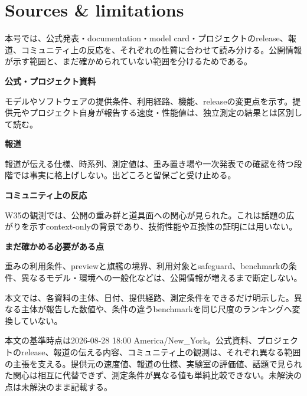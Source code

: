 \section*{Sources \& limitations}

本号では、公式発表・documentation・model card・プロジェクトのrelease、報道、コミュニティ上の反応を、それぞれの性質に合わせて読み分ける。公開情報が示す範囲と、まだ確かめられていない範囲を分けるためである。

\begin{tcolorbox}[enhanced,breakable,colback=SurveySoft,colframe=SurveyRule,boxrule=0.4pt,arc=1mm,left=3mm,right=3mm,top=2mm,bottom=2mm]
\textbf{公式・プロジェクト資料}\par
モデルやソフトウェアの提供条件、利用経路、機能、releaseの変更点を示す。提供元やプロジェクト自身が報告する速度・性能値は、独立測定の結果とは区別して読む。\par\smallskip
\textbf{報道}\par
報道が伝える仕様、時系列、測定値は、重み置き場や一次発表での確認を待つ段階では事実に格上げしない。出どころと留保ごと受け止める。\par\smallskip
\textbf{コミュニティ上の反応}\par
W35の観測では、公開の重み群と道具面への関心が見られた。これは話題の広がりを示すcontext-onlyの背景であり、技術性能や互換性の証明には用いない。\par\smallskip
\textbf{まだ確かめる必要がある点}\par
重みの利用条件、previewと旗艦の境界、利用対象とsafeguard、benchmarkの条件、異なるモデル・環境への一般化などは、公開情報が増えるまで断定しない。
\end{tcolorbox}

本文では、各資料の主体、日付、提供経路、測定条件をできるだけ明示した。異なる主体が報告した数値や、条件の違うbenchmarkを同じ尺度のランキングへ変換していない。

\nocite{glm53flash,qwen38flash,hy4preview,w35community,granite42,vscodeahp,cursororigin,copilotteams,harness,grith,fable5,gpt56kiro,vllm028,openthai20,autoalign,chinamiit,koreaethics}

\begin{claimboundary}
本文の基準時点は2026-08-28 18:00 America/New\_York。公式資料、プロジェクトのrelease、報道の伝える内容、コミュニティ上の観測は、それぞれ異なる範囲の主張を支える。提供元の速度値、報道の仕様、実験室の評価値、話題で見られた関心は相互に代替できず、測定条件が異なる値も単純比較できない。未解決の点は未解決のまま記載する。
\end{claimboundary}
